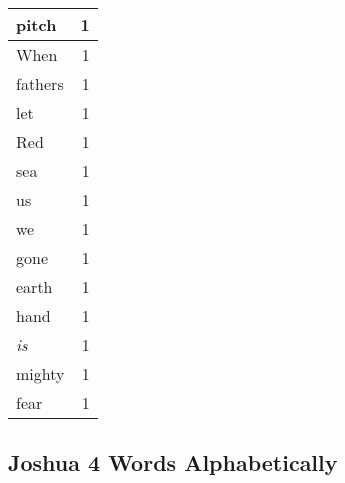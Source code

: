 \begin{center}
\begin{longtable}{l|r}
pitch & 1\\ \hline 
When & 1\\ \hline 
fathers & 1\\ \hline 
let & 1\\ \hline 
Red & 1\\ \hline 
sea & 1\\ \hline 
us & 1\\ \hline 
we & 1\\ \hline 
gone & 1\\ \hline 
earth & 1\\ \hline 
hand & 1\\ \hline 
\emph{is} & 1\\ \hline 
mighty & 1\\ \hline 
fear & 1\\ \hline 
\end{longtable}
\end{center}





\subsection{Joshua 4 Words Alphabetically}


\normalsize
 
